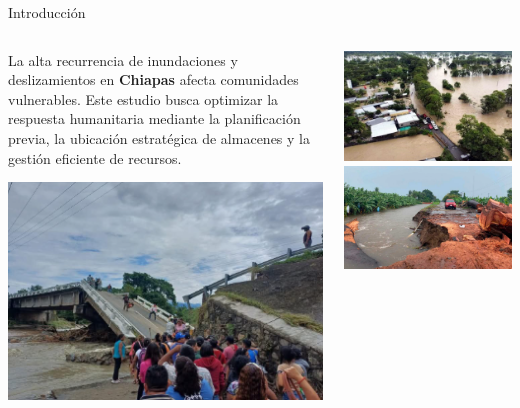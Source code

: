 \documentclass[
  ignorenonframetext,
]{beamer}
\begin{document}
\begin{frame}{Introducción}
\label{introducciuxf3n}
\begin{columns}[T]
\begin{column}{0.6\linewidth}
\justifying
{}

La alta recurrencia de inundaciones y deslizamientos en \textbf{Chiapas}
afecta comunidades vulnerables. Este estudio busca optimizar la
respuesta humanitaria mediante la planificación previa, la ubicación
estratégica de almacenes y la gestión eficiente de recursos.

\includegraphics[width=0.55\linewidth,height=\textheight,keepaspectratio]{puente.png}
\end{column}

\begin{column}{0.4\linewidth}
\includegraphics[width=1\linewidth,height=\textheight,keepaspectratio]{inundacion.png}
\includegraphics[width=1\linewidth,height=\textheight,keepaspectratio]{rio.png}
\end{column}
\end{columns}
\end{frame}
\end{document}
